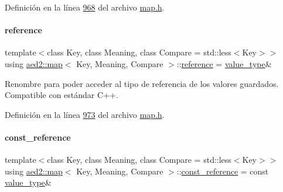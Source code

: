 Definición en la línea \hyperlink{map_8h_source_l00968}{968} del archivo \hyperlink{map_8h_source}{map.\+h}.

\mbox{\label{classaed2_1_1map_af4f147533b3c0207ab036c86ce13ec0d_af4f147533b3c0207ab036c86ce13ec0d}} 
\paragraph{\texorpdfstring{reference}{reference}}
{\footnotesize\ttfamily template$<$class Key, class Meaning, class Compare = std\+::less$<$\+Key$>$$>$ \\
using \hyperlink{classaed2_1_1map}{aed2\+::map}$<$ Key, Meaning, Compare $>$\+::\hyperlink{classaed2_1_1map_af4f147533b3c0207ab036c86ce13ec0d_af4f147533b3c0207ab036c86ce13ec0d}{reference} =  \hyperlink{classaed2_1_1map_a719db98e0ff9a837610f76be33264680_a719db98e0ff9a837610f76be33264680}{value\+\_\+type}\&}



Renombre para poder acceder al tipo de referencia de los valores guardados. Compatible con estándar C++. 



Definición en la línea \hyperlink{map_8h_source_l00973}{973} del archivo \hyperlink{map_8h_source}{map.\+h}.

\mbox{\label{classaed2_1_1map_a277080d3db76f19df9319ecba16475a9_a277080d3db76f19df9319ecba16475a9}} 
\paragraph{\texorpdfstring{const\+\_\+reference}{const\_reference}}
{\footnotesize\ttfamily template$<$class Key, class Meaning, class Compare = std\+::less$<$\+Key$>$$>$ \\
using \hyperlink{classaed2_1_1map}{aed2\+::map}$<$ Key, Meaning, Compare $>$\+::\hyperlink{classaed2_1_1map_a277080d3db76f19df9319ecba16475a9_a277080d3db76f19df9319ecba16475a9}{const\+\_\+reference} =  const \hyperlink{classaed2_1_1map_a719db98e0ff9a837610f76be33264680_a719db98e0ff9a837610f76be33264680}{value\+\_\+type}\&}



